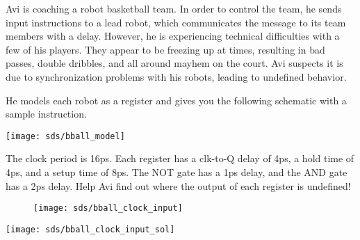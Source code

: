 \question
Avi is coaching a robot basketball team. In order to control the team, he sends input instructions to a lead robot, which communicates the message to its team members with a delay. However, he is experiencing technical difficulties with a few of his players. They appear to be freezing up at times, resulting in bad passes, double dribbles, and all around mayhem on the court. Avi suspects it is due to synchronization problems with his robots, leading to undefined behavior.

He models each robot as a register and gives you the following schematic with a sample instruction.

\texttt{[image: sds/bball\_model]}

The clock period is 16ps. Each register has a clk-to-Q delay of 4ps, a hold time of 4ps, and a setup time of 8ps. The NOT gate has a 1ps delay, and the AND gate has a 2ps delay. Help Avi find out where the output of each register is undefined!


\begin{figure}\nopagebreak
\texttt{[image: sds/bball\_clock\_input]}\nopagebreak
\end{figure}
\nopagebreak
\begin{solution}
\texttt{[image: sds/bball\_clock\_input\_sol]}
\end{solution}

